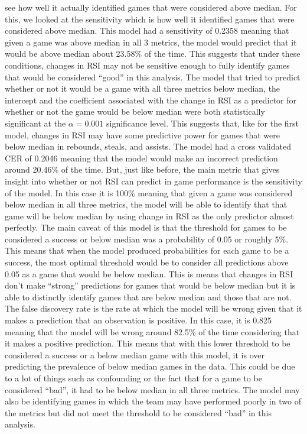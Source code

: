 \documentclass[
]{article}
\begin{document}
see how well it actually identified games that were considered above
median. For this, we looked at the sensitivity which is how well it
identified games that were considered above median. This model had a
sensitivity of 0.2358 meaning that given a game was above median in all
3 metrics, the model would predict that it would be above median about
23.58\% of the time. This suggests that under these conditions, changes
in RSI may not be sensitive enough to fully identify games that would be
considered ``good'' in this analysis. The model that tried to predict
whether or not it would be a game with all three metrics below median,
the intercept and the coefficient associated with the change in RSI as a
predictor for whether or not the game would be below median were both
statistically significant at the \(\alpha = 0.001\) significance level.
This suggests that, like for the first model, changes in RSI may have
some predictive power for games that were below median in rebounds,
steals, and assists. The model had a cross validated CER of 0.2046
meaning that the model would make an incorrect prediction around 20.46\%
of the time. But, just like before, the main metric that gives insight
into whether or not RSI can predict in game performance is the
sensitivity of the model. In this case it is 100\% meaning that given a
game was considered below median in all three metrics, the model will be
able to identify that that game will be below median by using change in
RSI as the only predictor almost perfectly. The main caveat of this
model is that the threshold for games to be considered a success or
below median was a probability of 0.05 or roughly 5\%. This means that
when the model produced probabilities for each game to be a success, the
most optimal threshold would be to consider all predictions above 0.05
as a game that would be below median. This is means that changes in RSI
don't make ``strong'' predictions for games that would be below median
but it is able to distinctly identify games that are below median and
those that are not. The false discovery rate is the rate at which the
model will be wrong given that it makes a prediction that an observation
is positive. In this case, it is 0.825 meaning that the model will be
wrong around 82.5\% of the time considering that it makes a positive
prediction. This means that with this lower threshold to be considered a
success or a below median game with this model, it is over predicting
the prevalence of below median games in the data. This could be due to a
lot of things such as confounding or the fact that for a game to be
considered ``bad'', it had to be below median in all three metrics. The
model may also be identifying games in which the team may have performed
poorly in two of the metrics but did not meet the threshold to be
considered ``bad'' in this analysis.
\end{document}
